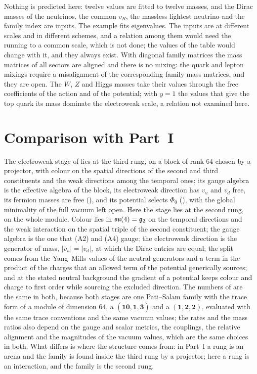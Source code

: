 Nothing is predicted here: twelve values are fitted to twelve masses, and the Dirac masses of the neutrinos, the common $v_R$, the massless
lightest neutrino and the family index are inputs. The example fits eigenvalues. The inputs are at different scales and in different
schemes, and a relation among them would need the running to a common scale, which is not done; the values of the table would change with
it, and they always exist. With diagonal family matrices the mass matrices of all sectors are aligned and there is no mixing: the quark and
lepton mixings require a misalignment of the corresponding family mass matrices, and they are open. The $W$, $Z$ and Higgs masses take their
values through the free coefficients of the action and of the potential; with $y=1$ the values that give the top quark its mass dominate the
electroweak scale, a relation not examined here.

\section{Comparison with Part~I}
\label{sec:partI}

The electroweak stage of  lies at the third rung, on a block of rank $64$ chosen by a projector, with colour on the
spatial directions of the second and third constituents and the weak directions among the temporal ones; its gauge algebra is the effective
algebra of the block, its electroweak direction has $v_u$ and $v_d$ free, its fermion masses are free (), and its potential
selects $\Phi_0$ (), with the global minimality of the full vacuum left open. Here the stage lies at the second rung, on the
whole module. Colour lies in $\mathfrak{su}(4)=\mathfrak g_2$ on the temporal directions and the weak interaction on the spatial triple of the second
constituent; the gauge algebra is the one that (A2) and (A4) gauge; the electroweak direction is the generator of mass, $|v_u|=|v_d|$, at
which the Dirac entries are equal; the split comes from the Yang--Mills values of the neutral generators and a term in the product of the
charges that an allowed term of the potential generically sources; and at the stated neutral background the gradient of a potential keeps
colour and charge to first order while sourcing the excluded direction. The numbers of
 are the same in both, because both stages are one Pati--Salam family with the trace form
of a module of dimension $64$, a $(\overline{\mathbf{10}},\mathbf1,\mathbf3)$ and a $(\mathbf1,\mathbf2,\mathbf2)$, evaluated with the same trace
conventions and the same vacuum values; the rates and the mass ratios also depend on the gauge and scalar metrics, the couplings, the
relative alignment and the magnitudes of the vacuum values, which are the same choices in both. What differs is where the structure comes
from: in Part~I a rung is an arena and the family is found inside the third rung by a projector; here a rung is an interaction, and the
family is the second rung.
